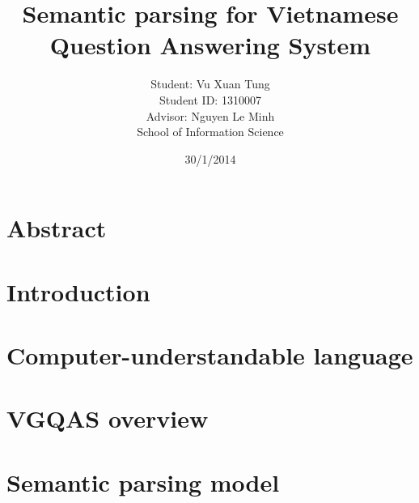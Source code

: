 \documentclass[oneside, 12pt]{book}
\title{Semantic parsing for Vietnamese Question Answering System}
\author{Student: Vu Xuan Tung\\
Student ID: 1310007 \\
Advisor: Nguyen Le Minh \\
School of Information Science}
\date{30/1/2014}
\begin{document}
\fontsize{13pt}{18pt}\selectfont
\maketitle
\frontmatter



\chapter*{\centering Abstract}


\tableofcontents

\listoffigures

\listoftables

\mainmatter

\chapter{ Introduction}


\chapter{Computer-understandable language}


\chapter{VGQAS overview}


\chapter{Semantic parsing model}






\end{document}
